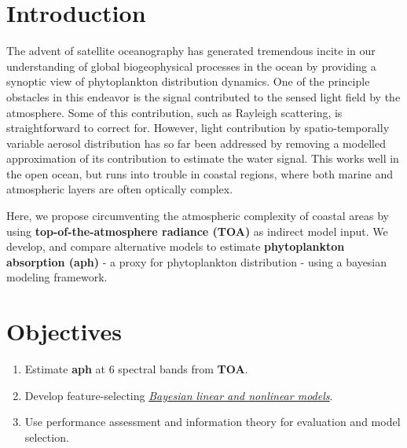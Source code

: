 \documentclass[a0,portrait]{a0poster}
\begin{document}
\begin{multicols}{2}

\color{SaddleBrown} %

\section*{Introduction}

The advent of satellite oceanography has generated tremendous incite in our understanding of global biogeophysical processes in the ocean by providing a synoptic view of phytoplankton distribution dynamics. One of the principle obstacles in this endeavor is the signal contributed to the sensed light field by the atmosphere. Some of this contribution, such as Rayleigh scattering, is straightforward to correct for. However, light contribution by spatio-temporally  variable aerosol distribution has so far been addressed by removing a modelled approximation of its contribution to estimate the water signal. This works  well in the open ocean, but runs into trouble in coastal regions, where both marine and atmospheric layers are often optically complex. 

Here, we propose circumventing the atmospheric complexity of coastal areas by using \textbf{top-of-the-atmosphere radiance (TOA)} as indirect model input. We develop, and compare alternative models to estimate \textbf{phytoplankton absorption (aph)} - a proxy for phytoplankton distribution - using a bayesian modeling framework.


\color{DarkSlateGray} %

\section*{Objectives}

\begin{enumerate}
    \item Estimate \textbf{aph} at 6 spectral bands from \textbf{TOA}.
    \item Develop feature-selecting \underline{\emph{Bayesian linear and nonlinear models}}.
    \item Use performance assessment and information theory for evaluation and model selection.
\end{enumerate}


\end{multicols}
\end{document}
